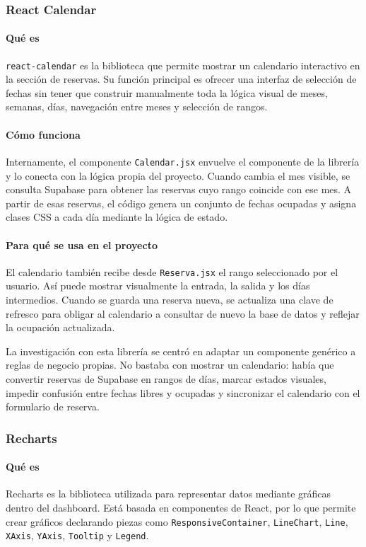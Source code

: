 \documentclass[11pt,a4paper]{article}
\begin{document}
\subsubsection{React Calendar}
\paragraph{Qué es}
\texttt{react-calendar} es la biblioteca que permite mostrar un calendario interactivo en la sección de reservas. Su función principal es ofrecer una interfaz de selección de fechas sin tener que construir manualmente toda la lógica visual de meses, semanas, días, navegación entre meses y selección de rangos.

\paragraph{Cómo funciona}
Internamente, el componente \texttt{Calendar.jsx} envuelve el componente de la librería y lo conecta con la lógica propia del proyecto. Cuando cambia el mes visible, se consulta Supabase para obtener las reservas cuyo rango coincide con ese mes. A partir de esas reservas, el código genera un conjunto de fechas ocupadas y asigna clases CSS a cada día mediante la lógica de estado.

\paragraph{Para qué se usa en el proyecto}
El calendario también recibe desde \texttt{Reserva.jsx} el rango seleccionado por el usuario. Así puede mostrar visualmente la entrada, la salida y los días intermedios. Cuando se guarda una reserva nueva, se actualiza una clave de refresco para obligar al calendario a consultar de nuevo la base de datos y reflejar la ocupación actualizada.

La investigación con esta librería se centró en adaptar un componente genérico a reglas de negocio propias. No bastaba con mostrar un calendario: había que convertir reservas de Supabase en rangos de días, marcar estados visuales, impedir confusión entre fechas libres y ocupadas y sincronizar el calendario con el formulario de reserva.

\subsubsection{Recharts}
\paragraph{Qué es}
Recharts es la biblioteca utilizada para representar datos mediante gráficas dentro del dashboard. Está basada en componentes de React, por lo que permite crear gráficos declarando piezas como \texttt{ResponsiveContainer}, \texttt{LineChart}, \texttt{Line}, \texttt{XAxis}, \texttt{YAxis}, \texttt{Tooltip} y \texttt{Legend}.
\end{document}

